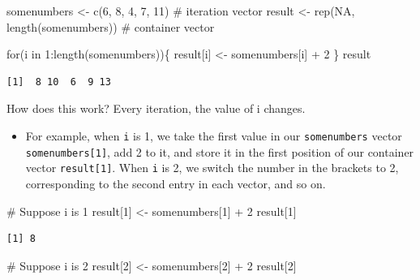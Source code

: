 \documentclass[
  letterpaper,
  DIV=11,
  numbers=noendperiod]{scrreprt}
\newenvironment{Shaded}{\begin{snugshade}}{\end{snugshade}}
\newcommand{\CommentTok}[1]{\textcolor[rgb]{0.37,0.37,0.37}{#1}}
\newcommand{\ConstantTok}[1]{\textcolor[rgb]{0.56,0.35,0.01}{#1}}
\newcommand{\ControlFlowTok}[1]{\textcolor[rgb]{0.00,0.23,0.31}{#1}}
\newcommand{\DecValTok}[1]{\textcolor[rgb]{0.68,0.00,0.00}{#1}}
\newcommand{\FunctionTok}[1]{\textcolor[rgb]{0.28,0.35,0.67}{#1}}
\newcommand{\NormalTok}[1]{\textcolor[rgb]{0.00,0.23,0.31}{#1}}
\newcommand{\OtherTok}[1]{\textcolor[rgb]{0.00,0.23,0.31}{#1}}
\newcommand{\SpecialCharTok}[1]{\textcolor[rgb]{0.37,0.37,0.37}{#1}}
\providecommand{\tightlist}{%
  \setlength{\itemsep}{0pt}\setlength{\parskip}{0pt}}\usepackage{longtable,booktabs,array}
\begin{document}
\begin{Shaded}
\begin{Highlighting}[]
\NormalTok{somenumbers }\OtherTok{\textless{}{-}} \FunctionTok{c}\NormalTok{(}\DecValTok{6}\NormalTok{, }\DecValTok{8}\NormalTok{, }\DecValTok{4}\NormalTok{, }\DecValTok{7}\NormalTok{, }\DecValTok{11}\NormalTok{) }\CommentTok{\# iteration vector}
\NormalTok{result }\OtherTok{\textless{}{-}} \FunctionTok{rep}\NormalTok{(}\ConstantTok{NA}\NormalTok{, }\FunctionTok{length}\NormalTok{(somenumbers)) }\CommentTok{\# container vector}

\ControlFlowTok{for}\NormalTok{(i }\ControlFlowTok{in} \DecValTok{1}\SpecialCharTok{:}\FunctionTok{length}\NormalTok{(somenumbers))\{}
\NormalTok{  result[i] }\OtherTok{\textless{}{-}}\NormalTok{ somenumbers[i] }\SpecialCharTok{+} \DecValTok{2}
\NormalTok{\}}
\NormalTok{result}
\end{Highlighting}
\end{Shaded}

\begin{verbatim}
[1]  8 10  6  9 13
\end{verbatim}

How does this work? Every iteration, the value of i changes.

\begin{itemize}
\tightlist
\item
  For example, when \texttt{i} is 1, we take the first value in our
  \texttt{somenumbers} vector \texttt{somenumbers{[}1{]}}, add 2 to it,
  and store it in the first position of our container vector
  \texttt{result{[}1{]}}. When \texttt{i} is 2, we switch the number in
  the brackets to 2, corresponding to the second entry in each vector,
  and so on.
\end{itemize}

\begin{Shaded}
\begin{Highlighting}[]
\CommentTok{\# Suppose i is 1}
\NormalTok{result[}\DecValTok{1}\NormalTok{] }\OtherTok{\textless{}{-}}\NormalTok{ somenumbers[}\DecValTok{1}\NormalTok{] }\SpecialCharTok{+} \DecValTok{2}
\NormalTok{result[}\DecValTok{1}\NormalTok{]}
\end{Highlighting}
\end{Shaded}

\begin{verbatim}
[1] 8
\end{verbatim}

\begin{Shaded}
\begin{Highlighting}[]
\CommentTok{\# Suppose i is 2}
\NormalTok{result[}\DecValTok{2}\NormalTok{] }\OtherTok{\textless{}{-}}\NormalTok{ somenumbers[}\DecValTok{2}\NormalTok{] }\SpecialCharTok{+} \DecValTok{2}
\NormalTok{result[}\DecValTok{2}\NormalTok{]}
\end{Highlighting}
\end{Shaded}
\end{document}
